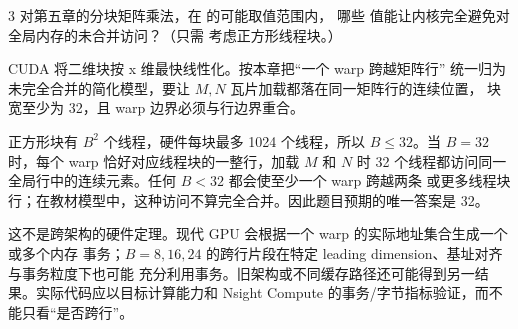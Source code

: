 \begin{solutionexercise}{3}
\problemheading 对第五章的分块矩阵乘法，在  的可能取值范围内，
哪些  值能让内核完全避免对全局内存的未合并访问？（只需
考虑正方形线程块。）

\approachheading CUDA 将二维块按 x 维最快线性化。按本章把“一个 warp 跨越矩阵行”
统一归为未完全合并的简化模型，要让 $M,N$ 瓦片加载都落在同一矩阵行的连续位置，
块宽至少为 32，且 warp 边界必须与行边界重合。

\answerheading 正方形块有 $B^2$ 个线程，硬件每块最多 1024 个线程，所以
$B\le32$。当 $B=32$ 时，每个 warp 恰好对应线程块的一整行，加载 $M$ 和 $N$ 时
32 个线程都访问同一全局行中的连续元素。任何 $B<32$ 都会使至少一个 warp 跨越两条
或更多线程块行；在教材模型中，这种访问不算完全合并。因此题目预期的唯一答案是 32。

这不是跨架构的硬件定理。现代 GPU 会根据一个 warp 的实际地址集合生成一个或多个内存
事务；$B=8,16,24$ 的跨行片段在特定 leading dimension、基址对齐与事务粒度下也可能
充分利用事务。旧架构或不同缓存路径还可能得到另一结果。实际代码应以目标计算能力和
Nsight Compute 的事务/字节指标验证，而不能只看“是否跨行”。


\end{solutionexercise}
